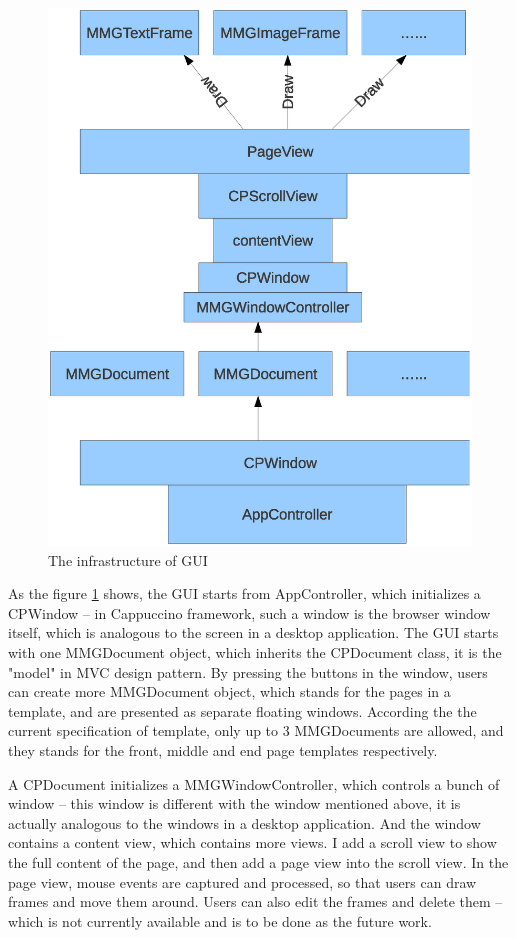 \documentclass[12pt,twoside,a4paper]{report}
\begin{document}
\begin{figure}[p]
\centering
\includegraphics[scale=0.5]{GUIInfrastructure.eps}
\caption{The infrastructure of GUI}
\label{fig3}
\end{figure}

  As the figure \ref{fig3} shows, the GUI starts from AppController, which initializes a CPWindow -- in Cappuccino framework, such a window is the browser window itself, which is analogous to the screen in a desktop application. The GUI starts with one MMGDocument object, which inherits the CPDocument class, it is the "model" in MVC design pattern. By pressing the buttons in the window, users can create more MMGDocument object, which stands for the pages in a template, and are presented as separate floating windows. According the the current specification of template, only up to 3 MMGDocuments are allowed, and they stands for the front, middle and end page templates respectively. 

  A CPDocument initializes a MMGWindowController, which controls a bunch of window -- this window is different with the window mentioned above, it is actually analogous to the windows in a desktop application. And the window contains a content view, which contains more views. I add a scroll view to show the full content of the page, and then add a page view into the scroll view. In the page view, mouse events are captured and processed, so that users can draw frames and move them around. Users can also edit the frames and delete them -- which is not currently available and is to be done as the future work.
\end{document}
